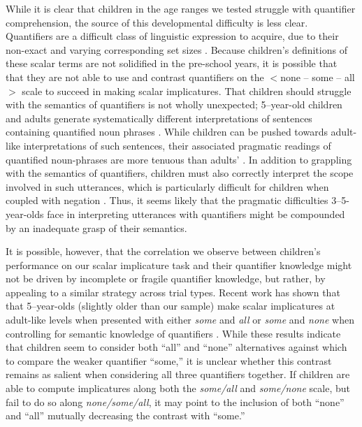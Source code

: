 \documentclass[man]{apa2}
\begin{document}
{While it is clear that children in the age ranges we tested struggle with quantifier comprehension, the source of this developmental difficulty is less clear. Quantifiers are a difficult class of linguistic expression to acquire, due to their non-exact and varying corresponding set sizes \cite{hurewitz2006}. Because children's definitions of these scalar terms are not solidified in the pre-school years, it is possible that that they are not able to use and contrast quantifiers on the $<${\sc none -- some -- all}$>$ scale to succeed in making scalar implicatures. That children should struggle with the semantics of quantifiers is not wholly unexpected; 5--year-old children and adults generate systematically different interpretations of sentences containing quantified noun phrases \cite{musolino1998}. While children can be pushed towards adult-like interpretations of such sentences, their associated pragmatic readings of quantified noun-phrases are more tenuous than adults' \cite{musolino2006}. In addition to grappling with the semantics of quantifiers, children must also correctly interpret the scope involved in such utterances, which is particularly difficult for children when coupled with negation \cite{moscati2014,musolino1998,musolino2006,zhou2009}. Thus, it seems likely that the pragmatic difficulties 3--5-year-olds face in interpreting utterances with quantifiers might be compounded by an inadequate grasp of their semantics.

It is possible, however, that the correlation we observe between children's performance on our scalar implicature task and their quantifier knowledge might not be driven by incomplete or fragile quantifier knowledge, but rather, by appealing to a similar strategy across trial types. Recent work has shown that that 5--year-olds (slightly older than our sample) make scalar implicatures at adult-like levels when presented with either \emph{some} and \emph{all} or \emph{some} and \emph{none} when controlling for semantic knowledge of quantifiers \cite{skordos2014,skordos2016}. While these results indicate that children seem to consider both ``all'' and ``none'' alternatives against which to compare the weaker quantifier ``some,'' it is unclear whether this contrast remains as salient when considering all three quantifiers together. If children are able to compute implicatures along both the \emph{some/all} and \emph{some/none} scale, but fail to do so along \emph{none/some/all}, it may point to the inclusion of both ``none'' and ``all'' mutually decreasing the contrast with ``some.''

}
\end{document}
